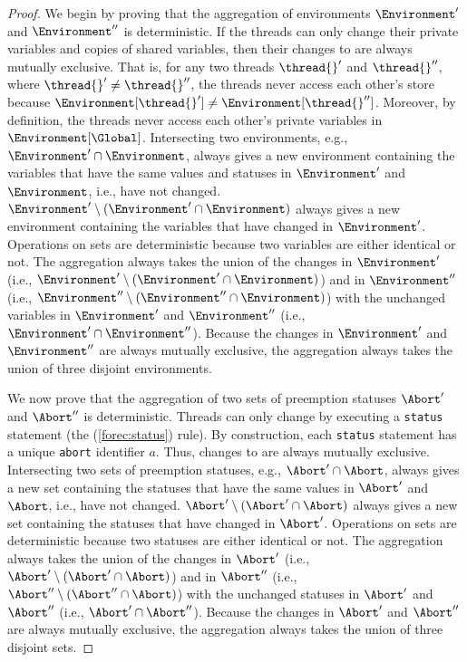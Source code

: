 \begin{proof}
	We begin by proving that the aggregation of environments $\Environment'$
	and $\Environment''$ is deterministic.
	If the threads can only change their private variables and 
	copies of shared variables, then their changes to \Environment{}
	are always mutually exclusive. That is, for any two threads 
	$\thread{}'$ and $\thread{}''$, where $\thread{}' \neq \thread{}''$, 
	the threads never access each other's store because
	$\Environment[\thread{}'] \neq \Environment[\thread{}'']$. 
	Moreover, by definition, the threads never access each other's private variables
	in $\Environment[\Global]$. Intersecting 
	two environments, e.g., $\Environment' \cap \Environment$, always gives 
	a new environment containing the variables that have the same values and 
	statuses in $\Environment'$ and $\Environment$, i.e., have not changed. 
	$\Environment' \setminus (\Environment' \cap \Environment)$ always
	gives a new environment containing the variables that have changed in 
	$\Environment'$. Operations on sets are deterministic because two
	variables are either identical or not.
	The aggregation always takes the union of the changes in $\Environment'$ (i.e., 
	$\Environment' \setminus (\Environment' \cap \Environment)$) 
	and in $\Environment''$ (i.e., 
	$\Environment'' \setminus (\Environment'' \cap \Environment)$) 
	with the unchanged variables in $\Environment'$ and $\Environment''$
	(i.e., $\Environment' \cap \Environment''$). 
	Because the changes in $\Environment'$ and $\Environment''$ are always 
	mutually exclusive, the aggregation always takes the union of three disjoint
	environments.
	
	We now prove that the aggregation of two sets of preemption statuses $\Abort'$
	and $\Abort''$ is deterministic. Threads can only change \Abort{} by 
	executing a \verb$status$ statement (the (\ref{forec:status}) 
	rule). By construction, each \verb$status$ statement has 
	a unique \verb$abort$ identifier $a$. Thus, changes to 
	\Abort{} are always mutually exclusive. 
	Intersecting two sets of preemption statuses, e.g., $\Abort' \cap \Abort$, always gives 
	a new set containing the statuses that have the same values in 
	$\Abort'$ and $\Abort$, i.e., have not changed. 
	$\Abort' \setminus (\Abort' \cap \Abort)$ always
	gives a new set containing the statuses that have changed in 
	$\Abort'$. Operations on sets are deterministic because two
	statuses are either identical or not.
	The aggregation always takes the union of the changes in $\Abort'$ (i.e., 
	$\Abort' \setminus (\Abort' \cap \Abort)$) 
	and in $\Abort''$ (i.e., 
	$\Abort'' \setminus (\Abort'' \cap \Abort)$) 
	with the unchanged statuses in $\Abort'$ and $\Abort''$
	(i.e., $\Abort' \cap \Abort''$). 
	Because the changes in $\Abort'$ and $\Abort''$ are always 
	mutually exclusive, the aggregation always takes the union of three disjoint 
	sets.
\end{proof}

